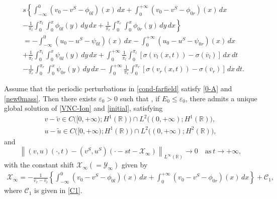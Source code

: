\documentclass[10pt,a4paper]{amsart}
\def\R{\mathbb{R}}
\def\X{\mathcal{X}}
\def\Y{\mathcal{Y}}
\def\avl{\overline{v}_l}
\def\avr{\overline{v}_r}
\def\ut{\tilde{u}}
\def\vt{\tilde{v}}
\newcommand{\norm}[1]{\left\lVert #1 \right\rVert}
\begin{document}
\begin{equation}\label{new0mass}
	\begin{aligned}
		&s\left\{\int_{-\infty}^{0}(v_0-v^S-\phi_{0l})(x)\,dx+\int_{0}^{+\infty} (v_0-v^S-\phi_{0r})(x)\,dx\right.\\
		&\left.-\frac{1}{\pi_l}\int_{0}^{\pi_l}\int_{0}^{x} \phi_{0l}(y) \,dy \,dx+\frac{1}{\pi_r}\int_{0}^{\pi_r}\int_{0}^{x} \phi_{0r}(y) \,dy \,dx\right\}\\
		&=-\int_{-\infty}^{0}(u_0-u^S-\psi_{0l})(x)\,dx-\int_{0}^{+\infty}(u_0-u^S-\psi_{0r})(x)\,dx\\
		&+\frac{1}{\pi_l}\int_{0}^{\pi_l}\int_{0}^{x} \psi_{0l}(y) \,dy \,dx+\int_{0}^{+\infty}\frac{1}{\pi_l}\int_{0}^{\pi_l}[\sigma(v_l(x,t))-\sigma(\avl)] \,dx \,dt\\
		&-\frac{1}{\pi_r}\int_{0}^{\pi_r}\int_{0}^{x} \psi_{0r}(y) \,dy \,dx-\int_{0}^{+\infty}\frac{1}{\pi_r}\int_{0}^{\pi_r}[\sigma(v_r(x,t))-\sigma(\avr)] \,dx \,dt.
	\end{aligned}
\end{equation}

\begin{theorem}\label{mainresult}
	Assume that the periodic perturbations in \eqref{cond-farfield} satisfy \eqref{0-A} and \eqref{new0mass}. Then there exists $\varepsilon_0>0$ such that
	, if $E_0\leq \varepsilon_0$, there admits a unique global solution of \eqref{VNC-Ion} and \eqref{initial}, satisfying
\begin{equation}\label{regularity}
		\begin{aligned}
		v-\vt \in C\Big([0,+\infty);H^1(\R)\Big)\cap L^2\Big((0,+\infty);H^1(\R)\Big),\\
		u-\ut \in C\Big([0,+\infty);H^1(\R)\Big)\cap L^2\Big((0,+\infty);H^2(\R)\Big),
	\end{aligned}
\end{equation}
	and 
	\begin{equation}\label{asymptotic}
		\norm{(v,u)(\cdot,t)-(v^S,u^S)(\cdot-st-\X_{\infty})}_{L^{\infty}(\R)}\to 0 \quad \text{as}~t \to +\infty,
	\end{equation}
	with the constant shift $\X_{\infty}(=\Y_{\infty})$ given by
	\begin{align*}
		\X_{\infty}=-\frac{1}{\avr-\avl}\left\{\int_{-\infty}^{0}(v_0-v^S-\phi_{0l})(x)  \,dx+\int_{0}^{+\infty}(v_0-v^S-\phi_{0r})(x)  \,dx  \right\}+\mathcal{C}_1,
	\end{align*}
	where $\mathcal{C} _1$ is given in \eqref{C1}.
\end{theorem}
\end{document}
